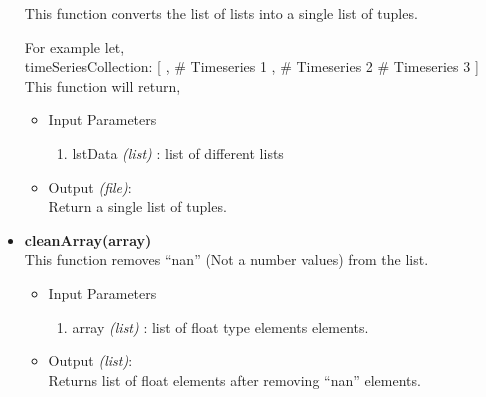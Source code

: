 \begin{itemize}
  This function converts the list of lists into a single list of tuples. 
  
  For example let,\\
	timeSeriesCollection: [ \newline
	    [1,2,3], \# Timeseries 1 \newline
	    [4,5,6], \# Timeseries 2 \newline
	    [7,8,9] \# Timeseries 3 \newline
	] \newline
	\\
	This function will return, \newline
  
 \begin{itemize}
	  \item Input Parameters
	  
	  \begin{enumerate}
	    \item lstData \textit{(list)} : list of different lists
	    \end{enumerate}

	  \item Output \textit{(file)}: \\
	  Return a single list of tuples.
	  
	\end{itemize}
	
 \item \textbf{cleanArray(array)} \\
 
	This function removes ``nan'' (Not a number values) from the list.
	
	\begin{itemize}
	  \item Input Parameters
	  
	  \begin{enumerate}
	    \item array \textit{(list)} : list of float type elements
elements.
	  \end{enumerate}

	  \item Output \textit{(list)}: \\
	  Returns list of float elements after removing ``nan'' elements.
	  

\end{itemize}
\end{itemize}
